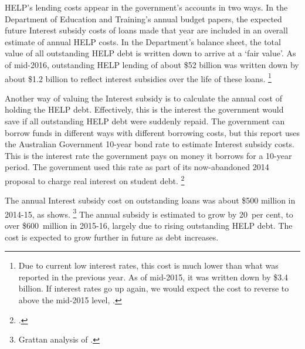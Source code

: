 \documentclass[embargoed]{grattan}
\begin{document}
\gls{HELP}'s lending costs appear in the government's accounts in two ways.
In the Department of Education and Training's annual budget papers, the expected future \gls{Interest subsidy} costs of loans made that year are included in an overall estimate of annual \gls{HELP} costs.
In the Department's balance sheet, the total value of all outstanding \gls{HELP} debt is written down to arrive at a `fair value'.
As of mid-2016, outstanding \gls{HELP} lending of about \$52 billion was written down by about \$1.2 billion to reflect interest subsidies over the life of these loans.%
\footnote{Due to current low interest rates, this cost is much lower than what was reported in the previous year. As of mid-2015, it was written down by \$3.4 billion. If interest rates go up again, we would expect the cost to reverse to above the mid-2015 level, \textcite[][176]{Education2016Annualreport}.}

Another way of valuing the \gls{Interest subsidy} is to calculate the annual cost of holding the \gls{HELP} debt.
Effectively, this is the interest the government would save if all outstanding \gls{HELP} debt were suddenly repaid.
The government can borrow funds in different ways with different borrowing costs, but this report uses the Australian Government \mbox{10-year} bond rate to estimate \gls{Interest subsidy} costs.
This is the interest rate the government pays on money it borrows for a 10-year period.
The government used this rate as part of its now-abandoned 2014 proposal to charge real interest on student debt.%
\footcite{Australia2014HigherEducationResearch}

The annual \gls{Interest subsidy} cost on outstanding loans was about \$500 million in 2014-15, as  shows.%
\footnote{Grattan analysis of \textcites{ABS2016ConsumerPriceIndex}{RBA-2015-f2Capitalmarketyields}{RBA2016F21Capitalmarket}.} 
The annual subsidy is estimated to grow by 20~per cent, to over \$600~million in 2015-16, largely due to rising outstanding \gls{HELP} debt.
The cost is expected to grow further in future as debt increases.
\end{document}
